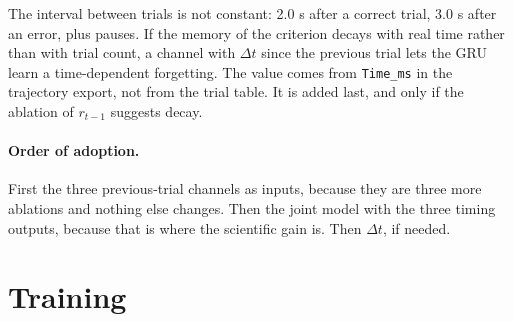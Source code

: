 \documentclass[11pt,a4paper]{article}
\begin{document}
The interval between trials is not constant: 2.0 s after a correct trial, 3.0 s after an
error, plus pauses. If the memory of the criterion decays with real time rather than with
trial count, a channel with $\Delta t$ since the previous trial lets the GRU learn a
time-dependent forgetting. The value comes from \texttt{Time\_ms} in the trajectory
export, not from the trial table. It is added last, and only if the ablation of
$r_{t-1}$ suggests decay.

\paragraph{Order of adoption.} First the three previous-trial channels as inputs,
because they are three more ablations and nothing else changes. Then the joint model
with the three timing outputs, because that is where the scientific gain is. Then
$\Delta t$, if needed.

\section{Training}
\end{document}
